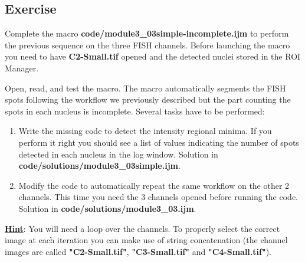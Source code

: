 \documentclass[11pt,a4paper,oneside]{report}
\begin{document}
\subsection{Exercise }
Complete the macro \textbf{code/module3\_03simple-incomplete.ijm} to perform the previous sequence on the three FISH channels. Before launching the macro you need to have \textbf{C2-Small.tif} opened and the detected nuclei stored in the ROI Manager.

Open, read, and test the macro. The macro automatically segments the FISH spots following the workflow we previously described but the part counting the spots in each nucleus is incomplete. Several tasks have to be performed:

\begin{enumerate}

\item Write the missing code to detect the intensity regional minima. If you perform it right you should see a list of values indicating the number of spots detected in each nucleus in the log window. Solution in \textbf{code/solutions/module3\_03simple.ijm}.

\item Modify the code to automatically repeat the same workflow on the other 2 channels. This time you need the 3 channels opened before running the code. Solution in \textbf{code/solutions/module3\_03.ijm}.
\end{enumerate}

\textbf{\underline{Hint}}: You will need a loop over the channels. To properly select the correct image at each iteration you can make use of string concatenation (the channel images are called \textbf{"C2-Small.tif"}, \textbf{"C3-Small.tif"} and \textbf{"C4-Small.tif"}).
\end{document}

